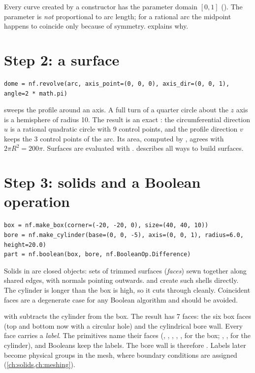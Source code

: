 Every curve created by a constructor has the parameter domain $[0,1]$ (). The
parameter is \emph{not} proportional to arc length; for a rational arc the midpoint happens to
coincide only because of symmetry.  explains why.

\section{Step 2: a surface}\label{sec:qs-surface}

\begin{lstlisting}
dome = nf.revolve(arc, axis_point=(0, 0, 0), axis_dir=(0, 0, 1), angle=2 * math.pi)
\end{lstlisting}

 sweeps the profile around an axis. A full turn of a quarter circle about the
$z$ axis is a hemisphere of radius 10. The result is an exact : the
circumferential direction $u$ is a rational quadratic circle with 9 control points, and the
profile direction $v$ keeps the 3 control points of the arc. Its area, computed by
, agrees with $2\pi R^2 = 200\pi$. Surfaces are evaluated with .
 describes all ways to build surfaces.

\section{Step 3: solids and a Boolean operation}\label{sec:qs-solid}

\begin{lstlisting}
box = nf.make_box(corner=(-20, -20, 0), size=(40, 40, 10))
bore = nf.make_cylinder(base=(0, 0, -5), axis=(0, 0, 1), radius=6.0, height=20.0)
part = nf.boolean(box, bore, nf.BooleanOp.Difference)
\end{lstlisting}

Solids in \NF{} are closed  objects: sets of trimmed surfaces (\emph{faces}) sewn
together along shared edges, with normals pointing outwards.  and
 create such shells directly. The cylinder is longer than the box is high,
so it cuts through cleanly. Coincident faces are a degenerate case for any Boolean algorithm and
should be avoided.

 with  subtracts the cylinder from the box. The result
has 7 faces: the six box faces (top and bottom now with a circular hole) and the cylindrical
bore wall. Every face carries a \emph{label}. The primitives name their faces (,
, , , ,  for the box; ,
,  for the cylinder), and Booleans keep the labels. The bore wall is
therefore . Labels later become physical groups in the mesh, where boundary conditions
are assigned (\cref{ch:solids,ch:meshing}).

